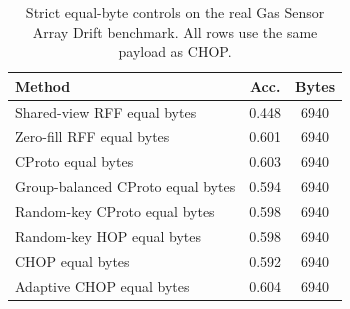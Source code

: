 \begin{table}[t]
\centering
\caption{Strict equal-byte controls on the real Gas Sensor Array Drift benchmark. All rows use the same payload as CHOP.}
\label{tab:strict-equal-byte-gas-drift-random}
\begin{tabular}{lcc}
\toprule
Method & Acc. & Bytes \\
\midrule
Shared-view RFF equal bytes & 0.448 & 6940 \\
Zero-fill RFF equal bytes & 0.601 & 6940 \\
CProto equal bytes & 0.603 & 6940 \\
Group-balanced CProto equal bytes & 0.594 & 6940 \\
Random-key CProto equal bytes & 0.598 & 6940 \\
Random-key HOP equal bytes & 0.598 & 6940 \\
CHOP equal bytes & 0.592 & 6940 \\
Adaptive CHOP equal bytes & 0.604 & 6940 \\
\bottomrule
\end{tabular}
\end{table}
